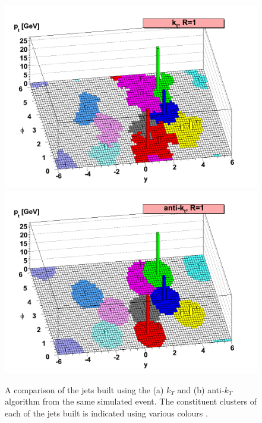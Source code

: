  \begin{figure}[!ht]
  \captionsetup[subfigure]{aboveskip=-5pt,justification=centering}
  \begin{center}
     {
      \includegraphics[width=0.45\linewidth, angle=0]{figs/Objects/jets_reco_shapes_kt.png}
    }%
     {
      \includegraphics[width=0.45\linewidth, angle=0]{figs/Objects/jets_reco_shapes_akt.png}
    }

  \end{center}
  \caption[A comparison of the jets built using the $k_T$ and anti-$k_T$ algorithm from the same simulated event.]
          {A comparison of the jets built using the (a) $k_T$ and (b) anti-$k_T$ algorithm from the same simulated event.
            The constituent clusters of each of the jets built is indicated using various colours \cite{obj-jets_reco_akt}.}
  \label{fig:obj-jets_reco_shapes}
\end{figure}


